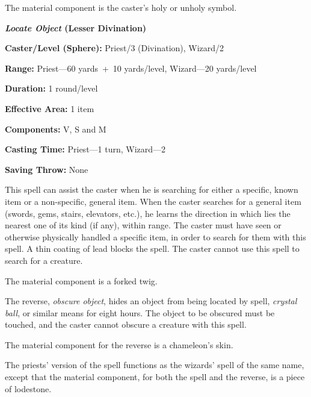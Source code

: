 \begin{multicols}{2}
The material component is the caster's holy or unholy symbol.

\vspace{1em}

\noindent
\begin{minipage}{\columnwidth}

\noindent \textbf{\textit{Locate Object} (Lesser Divination)}

\noindent \textbf{Caster/Level (Sphere):} Priest/3 (Divination), Wizard/2

\noindent \textbf{Range:} Priest---60 yards~+~10 yards/level, Wizard---20 yards/level

\noindent \textbf{Duration:} 1 round/level

\noindent \textbf{Effective Area:} 1 item

\noindent \textbf{Components:} V, S and M

\noindent \textbf{Casting Time:} Priest---1 turn, Wizard---2

\noindent \textbf{Saving Throw:} None

\end{minipage}

This spell can assist the caster when he is searching for either a specific, known item or a non-specific, general item.  When the caster searches for a general item (swords, gems, stairs, elevators, etc.), he learns the direction in which lies the nearest one of its kind (if any), within range.  The caster must have seen or otherwise physically handled a specific item, in order to search for them with this spell.  A thin coating of lead blocks the spell.  The caster cannot use this spell to search for a creature.

The material component is a forked twig.

The reverse, \textit{obscure object}, hides an object from being located by spell, \textit{crystal ball}, or similar means for eight hours.  The object to be obscured must be touched, and the caster cannot obscure a creature with this spell. 

The material component for the reverse is a chameleon's skin.

The priests' version of the spell functions as the wizards' spell of the same name, except that the material component, for both the spell and the reverse, is a piece of lodestone.

\vspace{1em}

\noindent
\begin{minipage}{\columnwidth}


\end{minipage}
\end{multicols}
